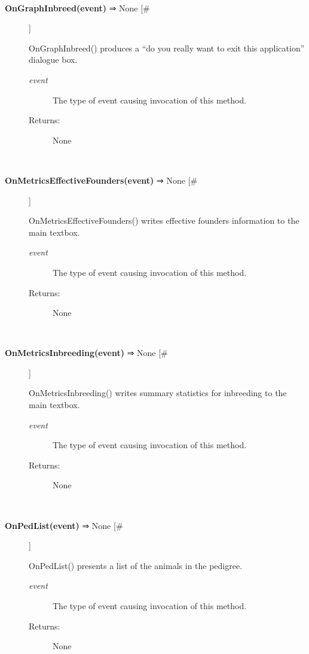 \begin{description}
\begin{description}
\end{description}
\\ 

\item[\textbf{OnGraphInbreed(event)}
 ⇒ None [\#]]

 OnGraphInbreed() produces a ``do you really want to exit this application'' dialogue box.
\begin{description}
\item[\emph{event}
] The type of event causing invocation of this method.
\item[Returns:] None

\end{description}
\\ 

\item[\textbf{OnMetricsEffectiveFounders(event)}
 ⇒ None [\#]]

 OnMetricsEffectiveFounders() writes effective founders information to the main textbox.
\begin{description}
\item[\emph{event}
] The type of event causing invocation of this method.
\item[Returns:] None

\end{description}
\\ 

\item[\textbf{OnMetricsInbreeding(event)}
 ⇒ None [\#]]

 OnMetricsInbreeding() writes summary statistics for inbreeding to the main textbox.
\begin{description}
\item[\emph{event}
] The type of event causing invocation of this method.
\item[Returns:] None

\end{description}
\\ 

\item[\textbf{OnPedList(event)}
 ⇒ None [\#]]

 OnPedList() presents a list of the animals in the pedigree.
\begin{description}
\item[\emph{event}
] The type of event causing invocation of this method.
\item[Returns:] None

\end{description}
\\ 


\end{description}
